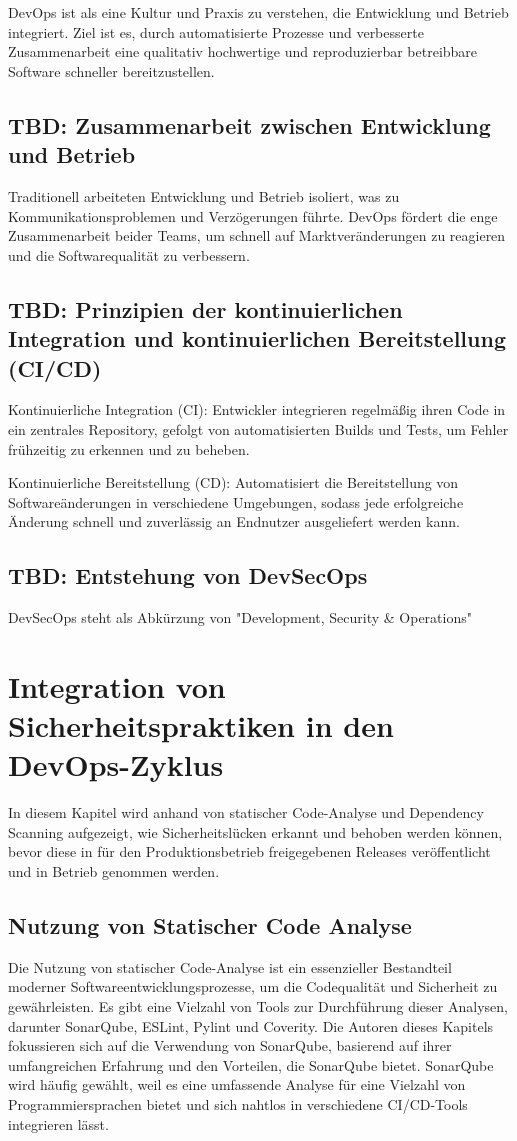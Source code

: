 \documentclass[conference,compsoc,final,a4paper]{IEEEtran}
\begin{document}
DevOps ist als eine Kultur und Praxis zu verstehen, die Entwicklung und Betrieb integriert. Ziel ist es, durch automatisierte Prozesse und verbesserte Zusammenarbeit eine qualitativ hochwertige und reproduzierbar betreibbare Software schneller bereitzustellen.

\subsection{TBD: Zusammenarbeit zwischen Entwicklung und Betrieb}
Traditionell arbeiteten Entwicklung und Betrieb isoliert, was zu Kommunikationsproblemen und Verzögerungen führte. DevOps fördert die enge Zusammenarbeit beider Teams, um schnell auf Marktveränderungen zu reagieren und die Softwarequalität zu verbessern. ~\cite{Virmani2015}


\subsection{TBD: Prinzipien der kontinuierlichen Integration und kontinuierlichen Bereitstellung (CI/CD)}
Kontinuierliche Integration (CI): Entwickler integrieren regelmäßig ihren Code in ein zentrales Repository, gefolgt von automatisierten Builds und Tests, um Fehler frühzeitig zu erkennen und zu beheben.

Kontinuierliche Bereitstellung (CD): Automatisiert die Bereitstellung von Softwareänderungen in verschiedene Umgebungen, sodass jede erfolgreiche Änderung schnell und zuverlässig an Endnutzer ausgeliefert werden kann.

\subsection{TBD: Entstehung von DevSecOps}
DevSecOps steht als Abkürzung von "Development, Security \& Operations"


\section{Integration von Sicherheitspraktiken in den DevOps-Zyklus}
In diesem Kapitel wird anhand von statischer Code-Analyse und Dependency Scanning aufgezeigt, wie Sicherheitslücken erkannt und behoben werden können, bevor diese in für den Produktionsbetrieb freigegebenen Releases veröffentlicht und in Betrieb genommen werden.


\subsection{Nutzung von Statischer Code Analyse}
Die Nutzung von statischer Code-Analyse ist ein essenzieller Bestandteil moderner Softwareentwicklungsprozesse, um die Codequalität und Sicherheit zu gewährleisten. Es gibt eine Vielzahl von Tools zur Durchführung dieser Analysen, darunter SonarQube, ESLint, Pylint und Coverity. Die Autoren dieses Kapitels fokussieren sich auf die Verwendung von SonarQube, basierend auf ihrer umfangreichen Erfahrung und den Vorteilen, die SonarQube bietet. SonarQube wird häufig gewählt, weil es eine umfassende Analyse für eine Vielzahl von Programmiersprachen bietet und sich nahtlos in verschiedene CI/CD-Tools integrieren lässt.
\end{document}
